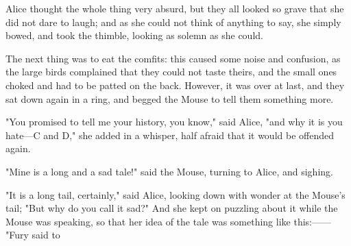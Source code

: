 ​Alice thought the whole thing very absurd, but they all looked so grave that she did not dare to laugh; and as she could not think of anything to say, she simply bowed, and took the thimble, looking as solemn as she could.

The next thing was to eat the comfits: this caused some noise and confusion, as the large birds complained that they could not taste theirs, and the small ones choked and had to be patted on the back. However, it was over at last, and they sat down again in a ring, and begged the Mouse to tell them something more.

"You promised to tell me your history, you know," said Alice, "and why it is you hate—C and D," she added in a whisper, half afraid that it would be offended again.

"Mine is a long and a sad tale!" said the Mouse, turning to Alice, and sighing.

"It is a long tail, certainly," said Alice, looking down with wonder at the Mouse's tail; "But why do you call it sad?" And she kept on puzzling about it while the Mouse was speaking, ​so that her idea of the tale was something like this:—— "Fury said to

